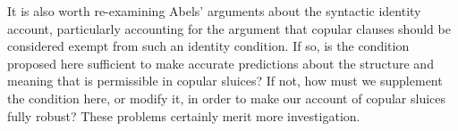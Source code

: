 \documentclass{turabian-researchpaper}
\begin{document}
It is also worth re-examining Abels' arguments about the syntactic identity account, particularly accounting for the argument that copular clauses should be considered exempt from such an identity condition. If so, is the condition proposed here sufficient to make accurate predictions about the structure and meaning that is permissible in copular sluices? If not, how must we supplement the condition here, or modify it, in order to make our account of copular sluices fully robust? These problems certainly merit more investigation. 











\clearpage
 
\end{document}
